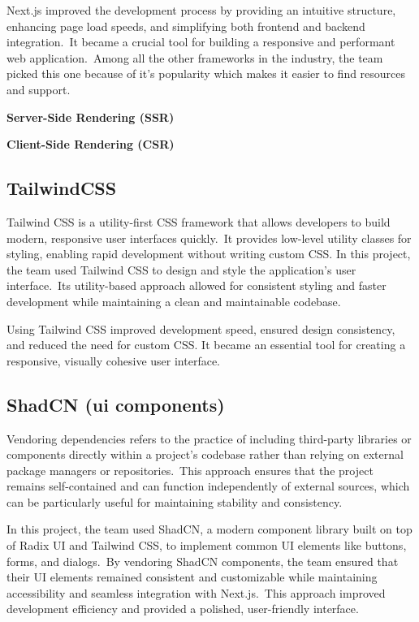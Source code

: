 Next.js improved the development process by providing an intuitive structure, enhancing page load speeds, and simplifying both frontend and backend integration.\ It became a crucial tool for building a responsive and performant web application.\ Among all the other frameworks in the industry, the team picked this one because of it's popularity which makes it easier to find resources and support.

\textbf{Server-Side Rendering (SSR)}\label{subsubsec:server-side-rendering-(ssr)}


\textbf{Client-Side Rendering (CSR)}\label{subsubsec:client-side-rendering-(csr)}


\subsection{TailwindCSS}\label{subsec:tailwindcss}

Tailwind CSS is a utility-first CSS framework that allows developers to build modern, responsive user interfaces quickly.\ It provides low-level utility classes for styling, enabling rapid development without writing custom CSS. In this project, the team used Tailwind CSS to design and style the application's user interface.\ Its utility-based approach allowed for consistent styling and faster development while maintaining a clean and maintainable codebase.\cite[TailwindCSS]{tailwind}

Using Tailwind CSS improved development speed, ensured design consistency, and reduced the need for custom CSS. It became an essential tool for creating a responsive, visually cohesive user interface.



\subsection{ShadCN (ui components)}\label{subsec:shadcn-(ui-components)}

Vendoring dependencies refers to the practice of including third-party libraries or components directly within a project's codebase rather than relying on external package managers or repositories.\ This approach ensures that the project remains self-contained and can function independently of external sources, which can be particularly useful for maintaining stability and consistency.\cite[ShadCN]{shadcn}

In this project, the team used ShadCN, a modern component library built on top of Radix UI and Tailwind CSS, to implement common UI elements like buttons, forms, and dialogs.\ By vendoring ShadCN components, the team ensured that their UI elements remained consistent and customizable while maintaining accessibility and seamless integration with Next.js.\ This approach improved development efficiency and provided a polished, user-friendly interface.

